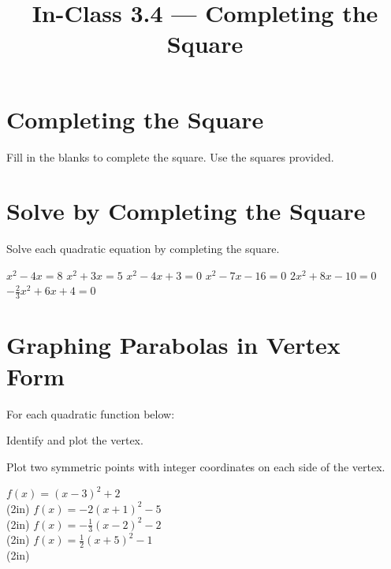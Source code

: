 

\title{In-Class 3.4 --- Completing the Square}


\maketitle

\section*{Completing the Square}
Fill in the blanks to complete the square. Use the squares provided.
\begin{smenum}
\mitemxx
{\CSsquare[4]}{\CSsquare}
\mitemxx
{\CSsquare}{\CSsquare}
\end{smenum}

\section*{Solve by Completing the Square}
Solve each quadratic equation by completing the square.
\begin{smenum}
\mitemxxx
{$x^2-4x=8$}
{$x^2+3x=5$}
{$x^2-4x+3=0$}
\mitemxxx
{$x^2-7x-16=0$}
{$2x^2+8x-10=0$}
{$-\frac{2}{3}x^2+6x+4=0$}
\end{smenum}

\section*{Graphing Parabolas in Vertex Form}
For each quadratic function below:
\begin{clist}
\item Identify and plot the vertex.
\item Plot two symmetric points with integer coordinates on each side of the vertex.
\end{clist}
\begin{smenum}
\mitemxx
{$f(x)=(x-3)^2+2$\\\GridSquareFitEO[10](2in)}
{$f(x)=-2(x+1)^2-5$\\\GridSquareFitEO[10](2in)}
\mitemxx
{$f(x)=-\frac{1}{3}(x-2)^2-2$\\\GridSquareFitEO[10](2in)}
{$f(x)=\frac{1}{2}(x+5)^2-1$\\\GridSquareFitEO[10](2in)}
\end{smenum}
